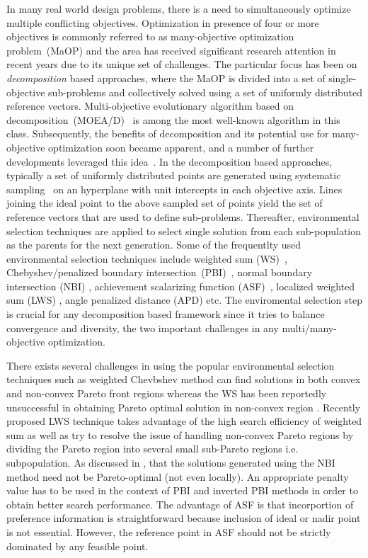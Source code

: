 \documentclass{sig-alternate}
\begin{document}
In many real world design problems, there is a need to simultaneously optimize multiple conflicting objectives. Optimization in presence of four or more objectives is commonly referred to as many-objective optimization problem~(MaOP) and the area has received significant research attention in recent years due to its unique set of challenges. The particular focus has been on \emph{decomposition} based approaches, where the MaOP is divided into a set of single-objective sub-problems and collectively solved using a set of uniformly distributed reference vectors. Multi-objective evolutionary algorithm based on decomposition~(MOEA/D)~\cite{zhang2007moead} is among the most well-known algorithm in this class. Subsequently, the benefits of decomposition and its potential use for many-objective optimization soon became apparent, and a number of further developments leveraged this idea~\cite{trivedisurvey}. In the decomposition based approaches, typically a set of uniformly distributed points are generated using systematic sampling~\cite{das1998normal} on an hyperplane with unit intercepts in each objective axis. Lines joining the ideal point to the above sampled set of points yield the set of reference vectors that are used to define sub-problems. Thereafter, environmental selection techniques are applied to select single solution from each sub-population as the parents for the next generation. Some of the frequentlty used environmental selection techniques include weighted sum (WS)~\cite{miettinen2012nonlinear, Voss2008}, Chebyshev/penalized boundary intersection~(PBI)~\cite{zhang2007moead}, normal boundary intersection (NBI) \cite{das1998normal}, achievement scalarizing function (ASF)~\cite{miettinen2012nonlinear, Yuan2016many}, localized weighted sum (LWS) \cite{Wang2016ls}, angle penalized distance (APD) \cite{Cheng2016many} etc. The enviromental selection step is crucial for any decomposition based framework since it tries to balance convergence and diversity, the two important challenges in any multi/many-objective optimization.

There exists several challenges in using the popular environmental selection techniques such as weighted Chevbshev method can find solutions in both convex and non-convex Pareto front regions whereas the WS has been reportedly unsuccessful in obtaining Pareto optimal solution in non-convex region \cite{miettinen2012nonlinear}. Recently proposed LWS technique takes advantage of the high search efficiency of weighted sum as well as try to resolve the issue of handling non-convex Pareto regions \cite{Wang2016ls} by dividing the Pareto region into several small sub-Pareto regions i.e. subpopulation. As discussed in \cite{shukla2007nbi}, that the solutions generated using the NBI method need not be Pareto-optimal (not even locally). An appropriate penalty value has to be used in the context of PBI and inverted PBI methods \cite{sato2014inverted} in order to obtain better search performance. The advantage of ASF is that incorportion of preference information is straightforward because inclusion of ideal or nadir point is not essential. However, the reference point in ASF should not be strictly dominated by any feasible point. 
\end{document}
